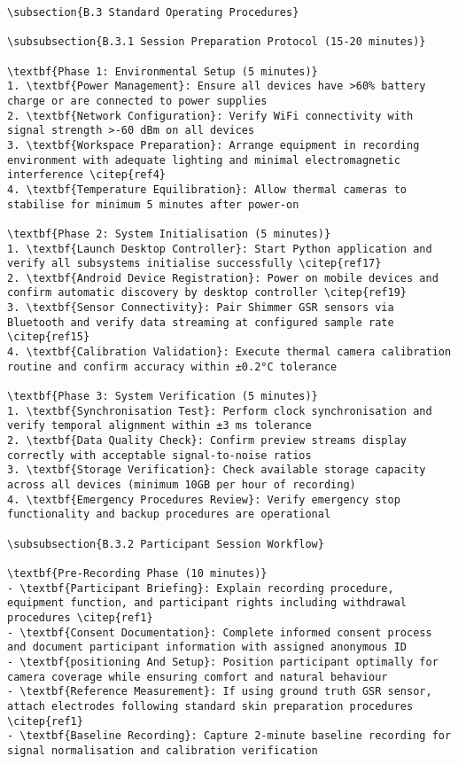 \begin{verbatim}
\subsection{B.3 Standard Operating Procedures}

\subsubsection{B.3.1 Session Preparation Protocol (15-20 minutes)}

\textbf{Phase 1: Environmental Setup (5 minutes)}
1. \textbf{Power Management}: Ensure all devices have >60% battery charge or are connected to power supplies
2. \textbf{Network Configuration}: Verify WiFi connectivity with signal strength >-60 dBm on all devices
3. \textbf{Workspace Preparation}: Arrange equipment in recording environment with adequate lighting and minimal electromagnetic interference \citep{ref4}
4. \textbf{Temperature Equilibration}: Allow thermal cameras to stabilise for minimum 5 minutes after power-on

\textbf{Phase 2: System Initialisation (5 minutes)}
1. \textbf{Launch Desktop Controller}: Start Python application and verify all subsystems initialise successfully \citep{ref17}
2. \textbf{Android Device Registration}: Power on mobile devices and confirm automatic discovery by desktop controller \citep{ref19}
3. \textbf{Sensor Connectivity}: Pair Shimmer GSR sensors via Bluetooth and verify data streaming at configured sample rate \citep{ref15}
4. \textbf{Calibration Validation}: Execute thermal camera calibration routine and confirm accuracy within ±0.2°C tolerance

\textbf{Phase 3: System Verification (5 minutes)}
1. \textbf{Synchronisation Test}: Perform clock synchronisation and verify temporal alignment within ±3 ms tolerance
2. \textbf{Data Quality Check}: Confirm preview streams display correctly with acceptable signal-to-noise ratios
3. \textbf{Storage Verification}: Check available storage capacity across all devices (minimum 10GB per hour of recording)
4. \textbf{Emergency Procedures Review}: Verify emergency stop functionality and backup procedures are operational

\subsubsection{B.3.2 Participant Session Workflow}

\textbf{Pre-Recording Phase (10 minutes)}
- \textbf{Participant Briefing}: Explain recording procedure, equipment function, and participant rights including withdrawal procedures \citep{ref1}
- \textbf{Consent Documentation}: Complete informed consent process and document participant information with assigned anonymous ID
- \textbf{positioning And Setup}: Position participant optimally for camera coverage while ensuring comfort and natural behaviour
- \textbf{Reference Measurement}: If using ground truth GSR sensor, attach electrodes following standard skin preparation procedures \citep{ref1}
- \textbf{Baseline Recording}: Capture 2-minute baseline recording for signal normalisation and calibration verification


\end{verbatim}
